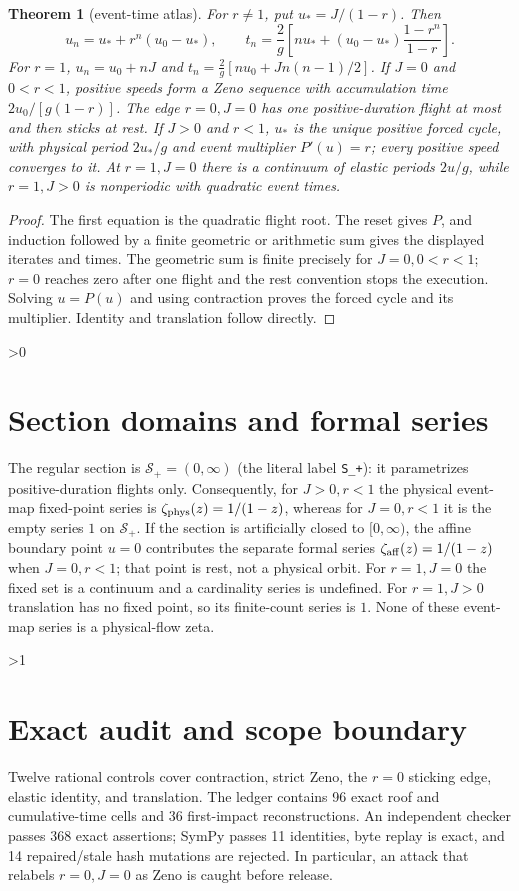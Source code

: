 \documentclass[11pt]{article}
\newtheorem{theorem}{Theorem}
\newcommand{\Sreg}{\mathcal S_+}
\begin{document}
\begin{theorem}[event-time atlas]\label{thm:impact}
For $r\ne1$, put $u_*=J/(1-r)$.  Then
\[
 u_n=u_*+r^n(u_0-u_*),\qquad
 t_n=\frac2g\left[n u_*+(u_0-u_*)\frac{1-r^n}{1-r}\right].
\]
For $r=1$, $u_n=u_0+nJ$ and
$t_n=\frac2g[n u_0+Jn(n-1)/2]$.  If $J=0$ and $0<r<1$, positive
speeds form a Zeno sequence with accumulation time
$2u_0/[g(1-r)]$.  The edge $r=0,J=0$ has one positive-duration flight at
most and then sticks at rest.  If $J>0$ and $r<1$, $u_*$ is the unique
positive forced cycle, with physical period $2u_*/g$ and event multiplier
$P'(u)=r$; every positive speed converges to it.  At $r=1,J=0$ there is a
continuum of elastic periods $2u/g$, while $r=1,J>0$ is nonperiodic with
quadratic event times.
\end{theorem}
\begin{proof}
The first equation is the quadratic flight root.  The reset gives $P$, and
induction followed by a finite geometric or arithmetic sum gives the displayed
iterates and times.  The geometric sum is finite precisely for
$J=0,0<r<1$; $r=0$ reaches zero after one flight and the rest convention
stops the execution.  Solving $u=P(u)$ and using contraction proves the forced
cycle and its multiplier.  Identity and translation follow directly.
\end{proof}

\ifnum\CRevisionRound>0
\section{Section domains and formal series}
The regular section is $\Sreg=(0,\infty)$ (the literal label
\texttt{S\_+}): it parametrizes positive-duration
flights only.  Consequently, for $J>0,r<1$ the physical event-map fixed-point
series is $\zeta_{\rm phys}(z)=1/(1-z)$, whereas for $J=0,r<1$ it is the
empty series $1$ on $\Sreg$.  If the section is artificially closed to
$[0,\infty)$, the affine boundary point $u=0$ contributes the separate formal
series $\zeta_{\rm aff}(z)=1/(1-z)$ when $J=0,r<1$; that point is rest, not
a physical orbit.  For $r=1,J=0$ the fixed set is a continuum and a
cardinality series is undefined.  For $r=1,J>0$ translation has no fixed
point, so its finite-count series is $1$.  None of these event-map series is a
physical-flow zeta.
\fi

\ifnum\CRevisionRound>1
\section{Exact audit and scope boundary}
Twelve rational controls cover contraction, strict Zeno, the $r=0$ sticking
edge, elastic identity, and translation.  The ledger contains 96 exact roof and
cumulative-time cells and 36 first-impact reconstructions.  An independent
checker passes 368 exact assertions; SymPy passes 11 identities, byte replay is
exact, and 14 repaired/stale hash mutations are rejected.  In particular, an
attack that relabels $r=0,J=0$ as Zeno is caught before release.
\end{document}
